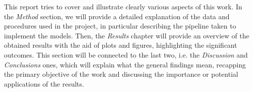 This report tries to cover and illustrate clearly various aspects of this work. 
In the \textit{Method} section, we will provide a detailed explanation of the data and procedures used in the project, in particular describing the pipeline taken to implement the models.
Then, the \textit{Results} chapter will provide an overview of the obtained results with the aid of plots and figures, highlighting the significant outcomes.
This section will be connected to the last two, i.e. the \textit{Discussion} and \textit{Conclusions} ones, which will explain what the general findings mean, recapping the primary objective of the work and discussing the importance or potential applications of the results.


